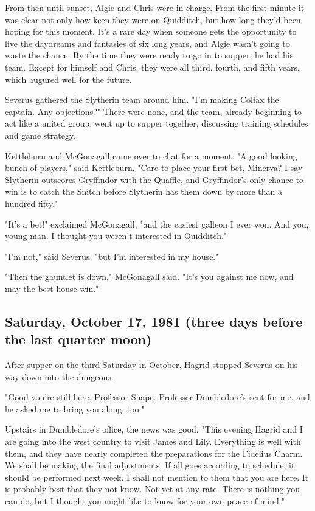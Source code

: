 From then until sunset, Algie and Chris were in charge. From the first minute it was clear not only how keen they were on Quidditch, but how long they'd been hoping for this moment. It's a rare day when someone gets the opportunity to live the daydreams and fantasies of six long years, and Algie wasn't going to waste the chance. By the time they were ready to go in to supper, he had his team. Except for himself and Chris, they were all third, fourth, and fifth years, which augured well for the future.

Severus gathered the Slytherin team around him. "I'm making Colfax the captain. Any objections?" There were none, and the team, already beginning to act like a united group, went up to supper together, discussing training schedules and game strategy.

Kettleburn and McGonagall came over to chat for a moment. "A good looking bunch of players," said Kettleburn. "Care to place your first bet, Minerva? I say Slytherin outscores Gryffindor with the Quaffle, and Gryffindor's only chance to win is to catch the Snitch before Slytherin has them down by more than a hundred fifty."

"It's a bet!" exclaimed McGonagall, "and the easiest galleon I ever won. And you, young man. I thought you weren't interested in Quidditch."

"I'm not," said Severus, "but I'm interested in my house."

"Then the gauntlet is down," McGonagall said. "It's you against me now, and may the best house win."

\subsection{Saturday, October 17, 1981 (three days before the last quarter moon)}

After supper on the third Saturday in October, Hagrid stopped Severus on his way down into the dungeons.

"Good you're still here, Professor Snape. Professor Dumbledore's sent for me, and he asked me to bring you along, too."

Upstairs in Dumbledore's office, the news was good. "This evening Hagrid and I are going into the west country to visit James and Lily. Everything is well with them, and they have nearly completed the preparations for the Fidelius Charm. We shall be making the final adjustments. If all goes according to schedule, it should be performed next week. I shall not mention to them that you are here. It is probably best that they not know. Not yet at any rate. There is nothing you can do, but I thought you might like to know for your own peace of mind."

